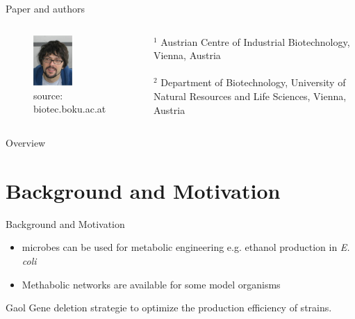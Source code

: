 \documentclass{beamer}
\begin{document}
\begin{frame}{Paper and authors}
\begin{columns}
      \begin{center}
        \begin{figure}
         \includegraphics[width=0.5\textwidth]{grafik/zanghellini} \\
         \tiny{source: biotec.boku.ac.at}
        \end{figure}
      \end{center}
    \tiny {$^{1}$ Austrian Centre of Industrial 
        Biotechnology, Vienna, Austria} 
    \\ ~ \\
    \tiny {$^{2}$ Department of Biotechnology, 
        University of Natural Resources and Life Sciences, 
        Vienna, Austria} 
 \end{columns}
\end{frame}

\begin{frame}{Overview}
    \tableofcontents
\end{frame}

\section{Background and Motivation}
\begin{frame}{Background and Motivation}
    \begin{itemize}
        \item microbes can be used for metabolic engineering 
        e.g. ethanol production in \emph{E. coli}
        \item Methabolic networks are available for some model organisms
    \end{itemize}
    \begin{block}{Gaol}
        Gene deletion strategie to optimize the production 
        efficiency of strains.
    \end{block}
\end{frame}
\end{document}
